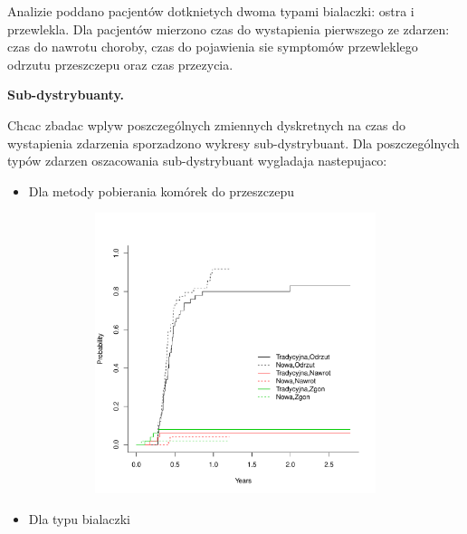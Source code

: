 \documentclass[]{article}
\title{}
\author{}
\date{}
\begin{document}
\maketitle


\thispagestyle{fancy} Analizie poddano pacjentów dotknietych dwoma
typami bialaczki: ostra i przewlekla. Dla pacjentów mierzono czas do
wystapienia pierwszego ze zdarzen: czas do nawrotu choroby, czas do
pojawienia sie symptomów przewleklego odrzutu przeszczepu oraz czas
przezycia.

\vspace{10pt}

\textbf{Sub-dystrybuanty.}

Chcac zbadac wplyw poszczególnych zmiennych dyskretnych na czas do
wystapienia zdarzenia sporzadzono wykresy sub-dystrybuant. Dla
poszczególnych typów zdarzen oszacowania sub-dystrybuant wygladaja
nastepujaco:

\begin{itemize}
\itemsep1pt\parskip0pt
\item
  Dla metody pobierania komórek do przeszczepu
\end{itemize}

\vspace{-22pt}

\includegraphics[width=16cm,height=8.2cm]{plot1.pdf}

\begin{itemize}
\itemsep1pt\parskip0pt
\item
  Dla typu bialaczki
\end{itemize}

\vspace{-22pt}
\end{document}

